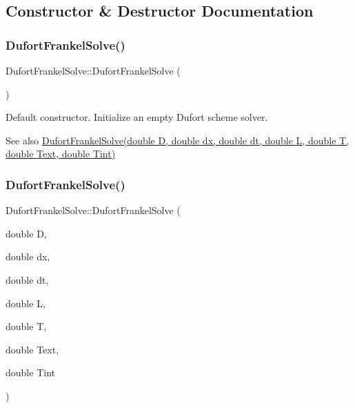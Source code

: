 \subsection{Constructor \& Destructor Documentation}
\mbox{\label{class_dufort_frankel_solve_ae348a9dda0114799f73f65ad852c19f9}} 
\subsubsection{\texorpdfstring{Dufort\+Frankel\+Solve()}{DufortFrankelSolve()}\hspace{0.1cm}{\footnotesize\ttfamily [1/2]}}
{\footnotesize\ttfamily Dufort\+Frankel\+Solve\+::\+Dufort\+Frankel\+Solve (\begin{DoxyParamCaption}{ }\end{DoxyParamCaption})\hspace{0.3cm}{\ttfamily [inline]}}

Default constructor. Initialize an empty Dufort scheme solver. \begin{DoxySeeAlso}{See also}
\hyperlink{class_dufort_frankel_solve_a2081c0668116f15316e61f95c86bd644}{Dufort\+Frankel\+Solve(double D, double dx, double dt, double L, double T, double Text, double Tint)} 
\end{DoxySeeAlso}
\mbox{\label{class_dufort_frankel_solve_a2081c0668116f15316e61f95c86bd644}} 
\subsubsection{\texorpdfstring{Dufort\+Frankel\+Solve()}{DufortFrankelSolve()}\hspace{0.1cm}{\footnotesize\ttfamily [2/2]}}
{\footnotesize\ttfamily Dufort\+Frankel\+Solve\+::\+Dufort\+Frankel\+Solve (\begin{DoxyParamCaption}\item[{double}]{D,  }\item[{double}]{dx,  }\item[{double}]{dt,  }\item[{double}]{L,  }\item[{double}]{T,  }\item[{double}]{Text,  }\item[{double}]{Tint }\end{DoxyParamCaption})\hspace{0.3cm}{\ttfamily [inline]}}

